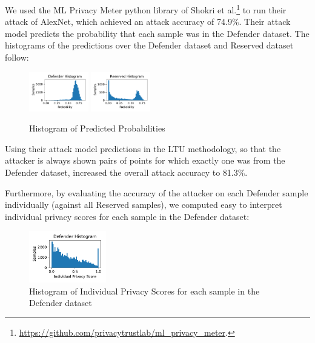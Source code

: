 \documentclass[letterpaper]{article}
\begin{document}
We used the ML Privacy Meter python library of Shokri et al.\footnote{\url{https://github.com/privacytrustlab/ml\_privacy\_meter}.} to run their attack of AlexNet, which achieved an attack accuracy of 74.9\%. Their attack model predicts the probability that each sample was in the Defender dataset. The histograms of the predictions over the Defender dataset and Reserved dataset follow:
\begin{figure}[ht]
  \includegraphics[width=0.23\textwidth]{Figures/Defender_Probs.pdf}
  \includegraphics[width=0.23\textwidth]{Figures/Reserve_Probs.pdf}
  \caption{Histogram of Predicted Probabilities}
  \label{fig:ml_privacy_meter}
\end{figure}

Using their attack model predictions in the LTU methodology, so that the attacker is always shown pairs of points for which exactly one was from the Defender dataset, increased the overall attack accuracy to 81.3\%.  

Furthermore, by evaluating the accuracy of the attacker on each Defender sample individually (against all Reserved samples), we computed easy to interpret individual privacy scores for each sample in the Defender dataset:
\begin{figure}[ht]
  \includegraphics[width=0.3\textwidth]{Figures/Defender_Score_Hist.pdf}
  \caption{Histogram of Individual Privacy Scores for each sample in the Defender dataset}
  \label{fig:ind_priv_score_hist}
\end{figure}
\end{document}
